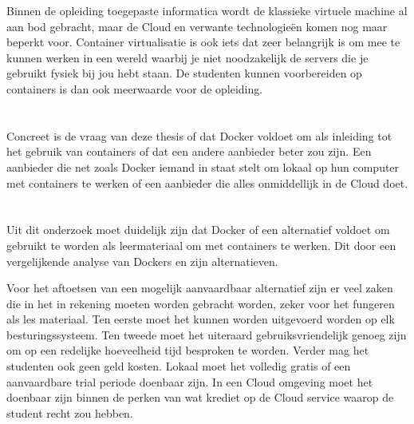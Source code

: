Binnen de opleiding toegepaste informatica wordt de klassieke virtuele machine al aan bod gebracht, maar de Cloud en verwante technologieën komen nog maar beperkt voor. Container virtualisatie is ook  iets dat zeer belangrijk is om mee te kunnen werken in een wereld waarbij je niet noodzakelijk de servers die je gebruikt fysiek bij jou hebt staan. De studenten kunnen voorbereiden op containers is dan ook meerwaarde voor de opleiding.

\section{}
\label{sec:onderzoeksvraag}

Concreet is de vraag van deze thesis of dat Docker voldoet om als inleiding tot het gebruik van containers of dat een andere aanbieder beter zou zijn. Een aanbieder die net zoals Docker iemand in staat stelt om lokaal op hun computer met containers te werken of een aanbieder die alles onmiddellijk  in de Cloud doet.

\section{}
\label{sec:onderzoeksdoelstelling}

Uit dit onderzoek moet duidelijk zijn dat Docker of een alternatief voldoet om gebruikt te worden als leermateriaal om met containers te werken. Dit door een vergelijkende analyse van Dockers en zijn alternatieven.

Voor het aftoetsen van een mogelijk aanvaardbaar alternatief zijn er veel zaken die in het in rekening moeten worden gebracht worden, zeker voor het fungeren als les materiaal. Ten eerste moet het kunnen worden uitgevoerd worden op elk besturingssysteem. Ten tweede moet het uiteraard gebruiksvriendelijk genoeg zijn om op een redelijke hoeveelheid tijd besproken te worden.  Verder mag het studenten ook geen geld kosten. Lokaal moet het volledig gratis of een aanvaardbare trial periode doenbaar zijn. In een Cloud omgeving moet het doenbaar zijn binnen de perken van wat krediet op de Cloud service waarop de student recht zou hebben.

